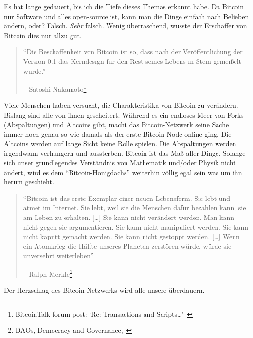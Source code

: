 Es hat lange gedauert, bis ich die Tiefe dieses Themas erkannt habe. Da Bitcoin
nur Software und alles open-source ist, kann man die Dinge einfach nach Belieben
ändern, oder? Falsch. \textit{Sehr} falsch. Wenig überraschend, wusste der Erschaffer von
Bitcoin dies nur allzu gut.

\begin{quotation}\begin{samepage}
\enquote{Die Beschaffenheit von Bitcoin ist
so, dass nach der Veröffentlichung der Version 0.1 das Kerndesign für den Rest
seines Lebens in Stein gemeißelt wurde.} \begin{flushright} -- Satoshi
Nakamoto\footnote{BitcoinTalk forum post: `Re:
Transactions and Scripts\ldots'~\cite{satoshi-set-in-stone}}
\end{flushright}\end{samepage}\end{quotation}

Viele Menschen haben versucht, die Charakteristika von Bitcoin zu verändern.
Bislang sind alle von ihnen gescheitert. Während es ein endloses Meer von Forks
(Abspaltungen) und Altcoins gibt, macht das Bitcoin-Netzwerk seine Sache immer
noch genau so wie damals als der erste Bitcoin-Node online ging. Die Altcoins
werden auf lange Sicht keine Rolle spielen. Die Abspaltungen werden irgendwann
verhungern und aussterben. Bitcoin ist das Maß aller Dinge. Solange sich unser
grundlegendes Verständnis von Mathematik und/oder Physik nicht ändert, wird es
dem “Bitcoin-Honigdachs” weiterhin völlig egal sein was um ihn herum geschieht.

\begin{quotation}\begin{samepage}
\enquote{Bitcoin ist das erste Exemplar einer neuen Lebensform. Sie lebt und
atmet im Internet. Sie lebt, weil sie die Menschen dafür bezahlen kann, sie am
Leben zu erhalten. [\ldots] Sie kann nicht verändert werden. Man kann nicht
gegen sie argumentieren. Sie kann nicht manipuliert werden. Sie kann nicht
kaputt gemacht werden. Sie kann nicht gestoppt werden. [\ldots] Wenn ein
Atomkrieg die Hälfte unseres Planeten zerstören würde, würde sie unversehrt
weiterleben}
\begin{flushright} -- Ralph Merkle\footnote{DAOs, Democracy and
Governance,~\cite{merkle-dao}}
\end{flushright}\end{samepage}\end{quotation}

Der Herzschlag des Bitcoin-Netzwerks wird alle unsere überdauern.

